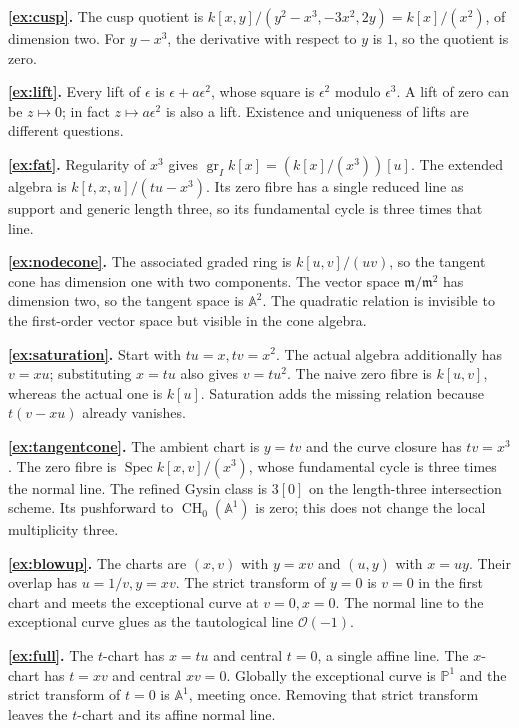 \documentclass[11pt,a4paper]{article}
\numberwithin{equation}{section}
\theoremstyle{definition}
\newcommand{\A}{\mathbb A}
\newcommand{\PP}{\mathbb P}
\newcommand{\OO}{\mathcal O}
\newcommand{\Spec}{\operatorname{Spec}}
\newcommand{\gr}{\operatorname{gr}}
\newcommand{\CH}{\operatorname{CH}}
\begin{document}
\textbf{\ref{ex:cusp}.} The cusp quotient is
$k[x,y]/(y^2-x^3,-3x^2,2y)=k[x]/(x^2)$, of dimension two. For
$y-x^3$, the derivative with respect to $y$ is $1$, so the quotient
is zero.

\textbf{\ref{ex:lift}.} Every lift of $\epsilon$ is
$\epsilon+a\epsilon^2$, whose square is $\epsilon^2$ modulo
$\epsilon^3$. A lift of zero can be $z\mapsto0$; in fact
$z\mapsto a\epsilon^2$ is also a lift. Existence and uniqueness
of lifts are different questions.

\textbf{\ref{ex:fat}.} Regularity of $x^3$ gives
$\gr_I k[x]=(k[x]/(x^3))[u]$. The extended algebra is
$k[t,x,u]/(tu-x^3)$. Its zero fibre has a single reduced line as
support and generic length three, so its fundamental cycle is
three times that line.

\textbf{\ref{ex:nodecone}.} The associated graded ring is
$k[u,v]/(uv)$, so the tangent cone has dimension one with two
components. The vector space $\mathfrak m/\mathfrak m^2$ has
dimension two, so the tangent space is $\A^2$. The quadratic
relation is invisible to the first-order vector space but visible
in the cone algebra.

\textbf{\ref{ex:saturation}.} Start with $tu=x,tv=x^2$.
The actual algebra additionally has $v=xu$; substituting $x=tu$
also gives $v=tu^2$. The naive zero fibre is $k[u,v]$, whereas
the actual one is $k[u]$. Saturation adds the missing relation
because $t(v-xu)$ already vanishes.

\textbf{\ref{ex:tangentcone}.} The ambient chart is $y=tv$ and the
curve closure has $tv=x^3$. The zero fibre is
$\Spec k[x,v]/(x^3)$, whose fundamental cycle is three times the
normal line. The refined Gysin class is $3[0]$ on the length-three
intersection scheme. Its pushforward to $\CH_0(\A^1)$ is zero;
this does not change the local multiplicity three.

\textbf{\ref{ex:blowup}.} The charts are $(x,v)$ with $y=xv$ and
$(u,y)$ with $x=uy$. Their overlap has $u=1/v,y=xv$.
The strict transform of $y=0$ is $v=0$ in the first chart and
meets the exceptional curve at $v=0,x=0$. The normal line to the
exceptional curve glues as the tautological line $\OO(-1)$.

\textbf{\ref{ex:full}.} The $t$-chart has $x=tu$ and central
$t=0$, a single affine line. The $x$-chart has $t=xv$ and central
$xv=0$. Globally the exceptional curve is $\PP^1$ and the strict
transform of $t=0$ is $\A^1$, meeting once. Removing that strict
transform leaves the $t$-chart and its affine normal line.
\end{document}
